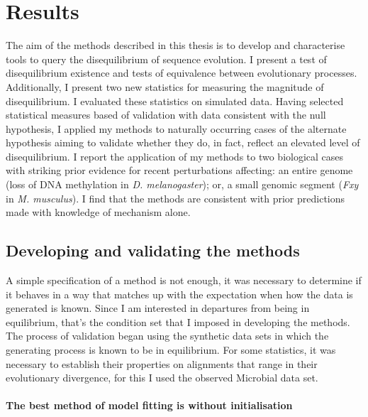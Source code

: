 \chapter{Results}


The aim of the methods described in this thesis is to develop and characterise tools to query the disequilibrium of sequence evolution. I present a test of disequilibrium existence and tests of equivalence between evolutionary processes. Additionally, I present two new statistics for measuring the magnitude of disequilibrium. I evaluated these statistics on simulated data. Having selected statistical measures based of validation with data consistent with the null hypothesis, I applied my methods to naturally occurring cases of the alternate hypothesis aiming to validate whether they do, in fact, reflect an elevated level of disequilibrium. I report the application of my methods to two biological cases with striking prior evidence for recent perturbations affecting: an entire genome (loss of DNA methylation in \textit{D. melanogaster}); or, a small genomic segment (\textit{Fxy} in \textit{M. musculus}). I find that the methods are consistent with prior predictions made with knowledge of mechanism alone.  

\section{Developing and validating the methods}

A simple specification of a method is not enough, it was necessary to determine if it behaves in a way that matches up with the expectation when how the data is generated is known. Since I am interested in departures from being in equilibrium, that’s the condition set that I imposed in developing the methods. The process of validation began using the synthetic data sets in which the generating process is known to be in equilibrium. For some statistics, it was necessary to establish their properties on alignments that range in their evolutionary divergence, for this I used the observed Microbial data set.  

\subsubsection*{The best method of model fitting is without initialisation}

